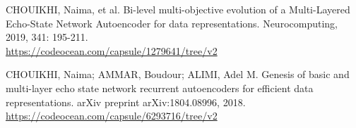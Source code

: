 \documentclass[uplatex,a4paper,10pt]{jsarticle}
\begin{document}
\begin{thebibliography}{99}
	 CHOUIKHI, Naima, et al. Bi-level multi-objective evolution of a Multi-Layered Echo-State Network Autoencoder for data representations. Neurocomputing, 2019, 341: 195-211.\\
	    \url{https://codeocean.com/capsule/1279641/tree/v2}
	
	 CHOUIKHI, Naima; AMMAR, Boudour; ALIMI, Adel M. Genesis of basic and multi-layer echo state network recurrent autoencoders for efficient data representations. arXiv preprint arXiv:1804.08996, 2018.\\
	    \url{https://codeocean.com/capsule/6293716/tree/v2}
	    

\end{thebibliography}
\end{document}
